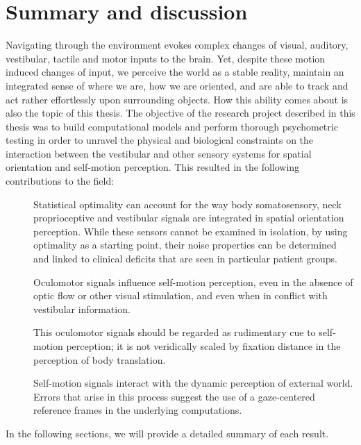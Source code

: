 \chapter{Summary and discussion}

Navigating through the environment evokes complex changes of visual, auditory, vestibular, tactile and
motor inputs to the brain. Yet, despite these motion induced changes of input, we perceive the world as a stable reality, maintain an integrated sense of where we are, how we are oriented, and are able to track and act rather effortlessly upon surrounding objects. How this ability comes about is also the topic of this thesis. The objective of the research project described in this thesis was to build computational models and perform thorough psychometric testing in order to unravel the physical and biological constraints on the interaction between the vestibular and other sensory systems for spatial orientation and self-motion perception. This resulted in the following contributions to the field:

\begin{description}
\item[] Statistical optimality can account for the way body somatosensory, neck proprioceptive and vestibular signals are integrated in spatial orientation perception. While these sensors cannot be examined in isolation, by using optimality as a starting point, their noise properties can be determined and linked to clinical deficits that are seen in particular patient groups.
\item[] Oculomotor signals influence self-motion perception, even in the absence of optic flow or other visual stimulation, and even when in conflict with vestibular information. 
\item[] This oculomotor signals should be regarded as rudimentary cue to self-motion perception; it is not veridically scaled by fixation distance in the perception of body translation. 
\item[] Self-motion signals interact with the dynamic perception of external world.  Errors that arise in this process suggest the use of a gaze-centered reference frames in the underlying computations. 
\end{description}

In the following sections, we will provide a detailed summary of each result. 

